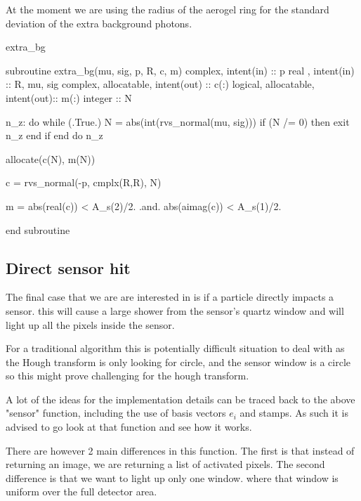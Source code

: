 \documentclass[10pt, a4paper]{article}
\begin{document}
At the moment we are using the radius of the aerogel ring for the standard deviation of the extra background photons.

\begin{codeblock}{extra_bg}
\begin{code}
subroutine extra_bg(mu, sig, p, R, c, m)
	complex, intent(in) :: p
	real   , intent(in) :: R, mu, sig
	complex, allocatable, intent(out) :: c(:)
	logical, allocatable, intent(out):: m(:)
	integer :: N
	
	n_z: do while (.True.)
		N = abs(int(rvs_normal(mu, sig)))
		if (N /= 0) then 
			exit n_z 
		end if
	end do n_z
	
	allocate(c(N), m(N))
	
	c = rvs_normal(-p, cmplx(R,R), N)
	
	m = abs(real(c)) < A_s(2)/2. .and. abs(aimag(c)) < A_s(1)/2.
	
end subroutine
\end{code}
\end{codeblock}

\subsection{Direct sensor hit}

The final case that we are are interested in is if a particle directly impacts a sensor. this will cause a large shower from the sensor's quartz window and will light up all the pixels inside the sensor.

For a traditional algorithm this is potentially difficult situation to deal with as the Hough transform is only looking for circle, and the sensor window is a circle so this might prove challenging for the hough transform. 

A lot of the ideas for the implementation details can be traced back to the above "sensor" function, including the use of basis vectors $e_i$ and stamps. As such it is advised to go look at that function and see how it works. 

There are however 2 main differences in this function. The first is that instead of returning an image, we are returning a list of activated pixels. The second difference is that we want to light up only one window. where that window is uniform over the full detector area. 
\end{document}

